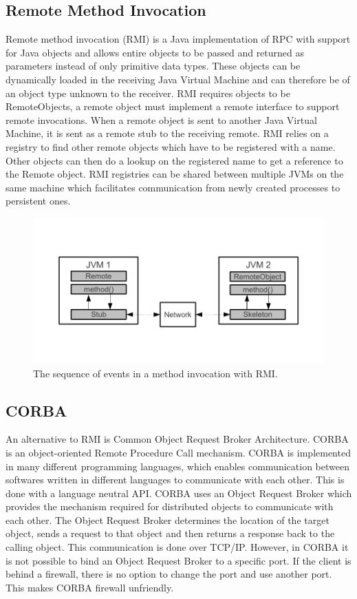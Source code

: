 \subsection{Remote Method Invocation}
Remote method invocation (RMI) is a Java implementation of RPC with support for Java objects and allows entire objects to be passed and returned as parameters instead of only primitive data types. These objects can be dynamically loaded in the receiving Java Virtual Machine and can therefore be of an object type unknown to the receiver. RMI requires objects to be RemoteObjects, a remote object must implement a remote interface to support remote invocations. When a remote object is sent to another Java Virtual Machine, it is sent as a remote stub to the receiving remote.
RMI relies on a registry to find other remote objects which have to be registered with a name. Other objects can then do a lookup on the registered name to get a reference to the Remote object. RMI registries can be shared between multiple JVMs on the same machine which facilitates communication from newly created processes to persistent ones.

\begin{figure}[ht]
	\centering
    	\includegraphics{part_2/remote_procedure_calls/rmi.pdf}
		\caption{The sequence of events in a method invocation with RMI.}
		\label{rmi} 
\end{figure}

\subsection{CORBA}
An alternative to RMI is Common Object Request Broker Architecture. CORBA is an object-oriented Remote Procedure Call mechanism. CORBA is implemented in many different programming languages, which enables communication between softwares written in different languages to communicate with each other. This is done with a language neutral API. CORBA uses an Object Request Broker which provides the mechanism required for distributed objects to communicate with each other. The Object Request Broker determines the location of the target object, sends a request to that object and then returns a response back to the calling object. This communication is done over TCP/IP. However, in CORBA it is not possible to bind an Object Request Broker to a specific port. If the client is behind a firewall, there is no option to change the port and use another port. This makes CORBA firewall unfriendly.
